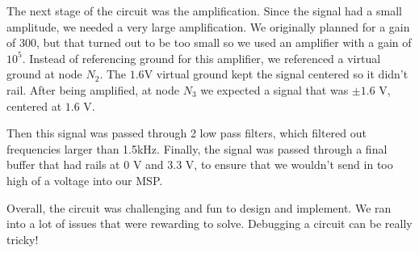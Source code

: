 \documentclass[12pt]{article}
\begin{document}
The next stage of the circuit was the amplification. Since the signal had a
small amplitude, we needed a very large amplification. We originally planned
for a gain of $300$, but that turned out to be too small so we used an
amplifier with a gain of $10^{5}$. Instead of referencing ground for this
amplifier, we referenced a virtual ground at node $N_2$. The $1.6$V virtual
ground kept the signal centered so it didn't rail.  After being amplified, at
node $N_3$ we expected a signal that was $\pm 1.6$ V, centered at $1.6$ V.

Then this signal was passed through 2 low pass filters, which filtered out
frequencies larger than 1.5kHz. Finally, the signal was passed through a final
buffer that had rails at $0$ V and $3.3$ V, to ensure that we wouldn't send in
too high of a voltage into our MSP.

Overall, the circuit was challenging and fun to design and implement. We ran
into a lot of issues that were rewarding to solve. Debugging a circuit can be
really tricky!
\end{document}

